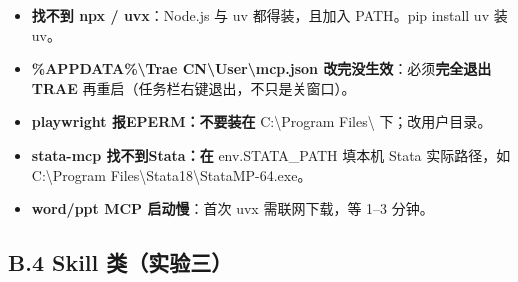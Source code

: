 \documentclass[
  american,
  chinese,
]{ctexart}
\providecommand{\tightlist}{%
  \setlength{\itemsep}{0pt}\setlength{\parskip}{0pt}}
\begin{document}
\begin{itemize}
\tightlist
\item
  {\textbf{\foreignlanguage{american}{找不到}}}\textbf{\foreignlanguage{american}{ {npx}
  / uvx}}\foreignlanguage{american}{：}\foreignlanguage{american}{Node.js }\foreignlanguage{american}{与}\foreignlanguage{american}{ {uv} }{\foreignlanguage{american}{都得装，且加入}}\foreignlanguage{american}{ {PATH{。}pip}
  install {uv} }\foreignlanguage{american}{装}\foreignlanguage{american}{ {uv}}\foreignlanguage{american}{。}
\item
  \textbf{\foreignlanguage{american}{\%APPDATA\%\textbackslash Trae
  CN\textbackslash User\textbackslash{}{mcp.json} }}{\textbf{\foreignlanguage{american}{改完没生效}}\foreignlanguage{american}{：必须\textbf{完全退出}}}\textbf{\foreignlanguage{american}{ TRAE}}\foreignlanguage{american}{ }{\foreignlanguage{american}{再重启（任务栏右键退出，不只是关窗口}}\foreignlanguage{american}{）。}
\item
  \textbf{\foreignlanguage{american}{playwright }\foreignlanguage{american}{报}\foreignlanguage{american}{ {EPERM{：不要装在}}}}\foreignlanguage{american}{ C:\textbackslash Program Files\textbackslash{} }{\foreignlanguage{american}{下；改用户目录}}\foreignlanguage{american}{。}
\item
  {\textbf{\foreignlanguage{american}{stata-mcp}}}\textbf{\foreignlanguage{american}{ }}{\textbf{\foreignlanguage{american}{找不到}}}\textbf{\foreignlanguage{american}{ {Stata{：在}}}}\foreignlanguage{american}{ {{env.STATA}\_PATH}
  }{\foreignlanguage{american}{填本机}}\foreignlanguage{american}{ Stata }{\foreignlanguage{american}{实际路径，如}}\foreignlanguage{american}{ C:\textbackslash Program Files\textbackslash Stata18\textbackslash StataMP-64.exe}\foreignlanguage{american}{。}
\item
  \textbf{\foreignlanguage{american}{word/ppt MCP }}{\textbf{\foreignlanguage{american}{启动慢}}\foreignlanguage{american}{：首次}}\foreignlanguage{american}{ {uvx} }{\foreignlanguage{american}{需联网下载，等}}\foreignlanguage{american}{ 1--3 }{\foreignlanguage{american}{分钟}}\foreignlanguage{american}{。}
\end{itemize}

\subsection{\texorpdfstring{\foreignlanguage{american}{B.4 Skill }{\foreignlanguage{american}{类（实验三}}\foreignlanguage{american}{）}}{B.4 Skill 类（实验三）}}\label{b.4-skill-ux7c7bux5b9eux9a8cux4e09}
\end{document}
